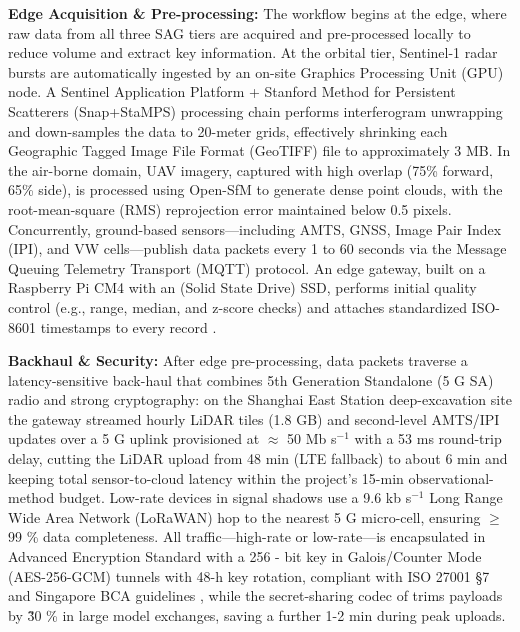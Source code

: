 \documentclass[preprint,11pt,authoryear,3p]{elsarticle}
\begin{document}
\textbf{Edge Acquisition \& Pre-processing:} The workflow begins at the edge, where raw data from all three SAG tiers are acquired and pre-processed locally to reduce volume and extract key information. At the orbital tier, Sentinel-1 radar bursts are automatically ingested by an on-site Graphics Processing Unit (GPU) node. A Sentinel Application Platform + Stanford Method for Persistent Scatterers (Snap+StaMPS) processing chain performs interferogram unwrapping and down-samples the data to 20-meter grids, effectively shrinking each Geographic Tagged Image File Format (GeoTIFF) file to approximately 3 MB. In the air-borne domain, UAV imagery, captured with high overlap (75\% forward, 65\% side), is processed using Open-SfM to generate dense point clouds, with the root-mean-square (RMS) reprojection error maintained below 0.5 pixels. Concurrently, ground-based sensors—including AMTS, GNSS, Image Pair Index (IPI), and VW cells—publish data packets every 1 to 60 seconds via the Message Queuing Telemetry Transport (MQTT) protocol. An edge gateway, built on a Raspberry Pi CM4 with an (Solid State Drive) SSD, performs initial quality control (e.g., range, median, and z-score checks) and attaches standardized ISO-8601 timestamps to every record \citep{iso8601-1:2019}.

\textbf{Backhaul \& Security:} After edge pre-processing, data packets traverse a latency-sensitive back-haul that combines 5th Generation Standalone (5 G SA) radio and strong cryptography: on the Shanghai East Station deep-excavation site the gateway streamed hourly LiDAR tiles (1.8 GB) and second-level AMTS/IPI updates over a 5 G uplink provisioned at $\approx$ 50 Mb s$^{-1}$ with a 53 ms round-trip delay, cutting the LiDAR upload from 48 min (LTE fallback) to about 6 min and keeping total sensor-to-cloud latency within the project's 15-min observational-method budget. Low-rate devices in signal shadows use a 9.6 kb s$^{-1}$ Long Range Wide Area Network (LoRaWAN) hop to the nearest 5 G micro-cell, ensuring $\ge$ 99 \% data completeness. All traffic—high-rate or low-rate—is encapsulated in Advanced Encryption Standard with a 256 - bit key in Galois/Counter Mode (AES-256-GCM) tunnels with 48-h key rotation, compliant with ISO 27001 §7 and Singapore BCA guidelines \citep{BCA_Rigorous_Approach_2022}, while the secret-sharing codec of \citep{10579069} trims payloads by \~30 \% in large model exchanges, saving a further 1-2 min during peak uploads.
\end{document}
